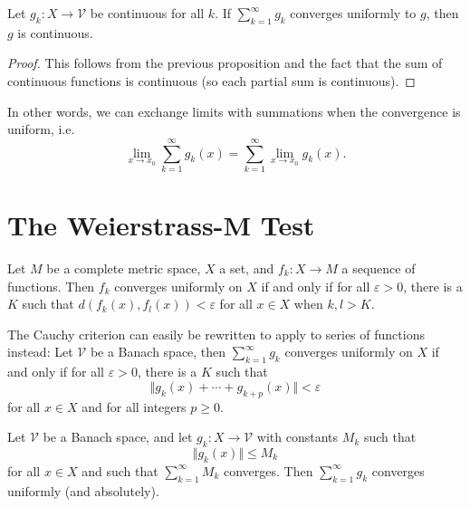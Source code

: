 \documentclass[twoside,10pt]{report}
\begin{document}
\begin{cor}
	Let $g_k: X \to \mathcal{V}$ be continuous for all $k$. If $\sum_{k=1}^{\infty} g_k$ converges uniformly to $g$, then $g$ is continuous.
\end{cor}
\begin{proof}
	This follows from the previous proposition and the fact that the sum of continuous functions is continuous (so each partial sum is continuous).
\end{proof}

\begin{note}[]
In other words, we can exchange limits with summations when the convergence is uniform, i.e.
\[
	\lim_{x \to x_0} \sum_{k=1}^{\infty} g_k(x) = \sum_{k=1}^{\infty} \lim_{x \to x_0} g_k(x).
\] 
\end{note}



\section{The Weierstrass-M Test}

\begin{thrm}
	Let $M$ be a complete metric space, $X$ a set, and $f_k: X \to M$ a sequence of functions. Then $f_k$ converges uniformly on $X$ if and only if for all $\varepsilon > 0$, there is a $K$ such that $d(f_k(x), f_l(x)) < \varepsilon$ for all $x \in X$ when $k,l > K$.
\end{thrm}

The Cauchy criterion can easily be rewritten to apply to series of functions instead: Let $\mathcal{V}$ be a Banach space, then $\sum_{k=1}^{\infty} g_k$ converges uniformly on $X$ if and only if for all $\varepsilon>0$, there is a $K$ such that
\[
	\Vert{g_k(x) + \cdots + g_{k+p}(x)}\Vert< \varepsilon
\] for all $x \in X$ and for all integers $p \geq 0$.

\begin{thrm}
	Let $\mathcal{V}$ be a Banach space, and let $g_k : X \to \mathcal{V}$ with constants $M_k$ such that
	\[
		\Vert{g_k(x)}\Vert\leq M_k
	\] for all $x \in X$ and such that $\sum_{k=1}^{\infty} M_k$ converges. Then $\sum_{k=1}^{\infty} g_k$ converges uniformly (and absolutely).
\end{thrm}

\end{document}
